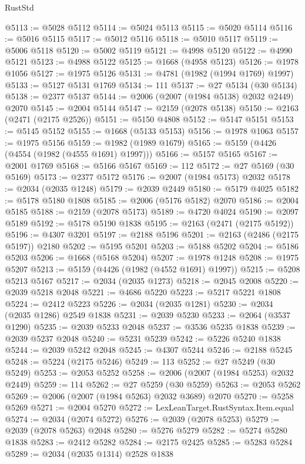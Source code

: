 \begin{lexlean}{RustStd}
\begin{coremodule}
@5113 := @5028 @5112
@5114 := @5024 @5113
@5115 := @5020 @5114
@5116 := @5016 @5115
@5117 := @5012 @5116
@5118 := @5010 @5117
@5119 := @5006 @5118
@5120 := @5002 @5119
@5121 := @4998 @5120
@5122 := @4990 @5121
@5123 := @4988 @5122
@5125 := @1668 (@4958 @5123)
@5126 := @1978 @1056
@5127 := @1975 @5126
@5131 := @4781 (@1982 (@1994 @1769) @1997)
@5133 := @5127 @5131 @1769
@5134 := 111
@5137 := @27 @5134 (@30 @5134)
@5138 := @2377 @5137
@5144 := @2006 (@2007 (@1984 @5138) @2032 @2449) @2070
@5145 := @2004 @5144
@5147 := @2159 (@2078 @5138)
@5150 := @2163 (@2471 (@2175 @2526))
@5151 := @5150 @4808
@5152 := @5147 @5151
@5153 := @5145 @5152
@5155 := @1668 (@5133 @5153)
@5156 := @1978 @1063
@5157 := @1975 @5156
@5159 := @1982 (@1989 @1679)
@5165 := @5159 (@4426 (@4554 (@1982 (@4555 @1691) @1997)))
@5166 := @5157 @5165
@5167 := @2001 @1769
@5168 := @5166 @5167
@5169 := 112
@5172 := @27 @5169 (@30 @5169)
@5173 := @2377 @5172
@5176 := @2007 (@1984 @5173) @2032
@5178 := @2034 (@2035 @1248)
@5179 := @2039 @2449
@5180 := @5179 @4025
@5182 := @5178 @5180 @1808
@5185 := @2006 (@5176 @5182) @2070
@5186 := @2004 @5185
@5188 := @2159 (@2078 @5173)
@5189 := @4720 @4024
@5190 := @2097 @5189
@5192 := @5178 @5190 @1838
@5195 := @2163 (@2471 (@2175 @5192))
@5196 := @4307 @3201
@5197 := @2188 @5196
@5201 := @2163 (@2486 (@2175 @5197)) @2180
@5202 := @5195 @5201
@5203 := @5188 @5202
@5204 := @5186 @5203
@5206 := @1668 (@5168 @5204)
@5207 := @1978 @1248
@5208 := @1975 @5207
@5213 := @5159 (@4426 (@1982 (@4552 @1691) @1997))
@5215 := @5208 @5213 @5167
@5217 := @2034 (@2035 @1273)
@5218 := @2045 @2008
@5220 := @2039 @5218 @2048
@5221 := @4686 @5220
@5223 := @5217 @5221 @1808
@5224 := @2412 @5223
@5226 := @2034 (@2035 @1281)
@5230 := @2034 (@2035 @1286) @2549 @1838
@5231 := @2039 @5230
@5233 := @2064 (@3537 @1290)
@5235 := @2039 @5233 @2048
@5237 := @3536 @5235 @1838
@5239 := @2039 @5237 @2048
@5240 := @5231 @5239
@5242 := @5226 @5240 @1838
@5244 := @2039 @5242 @2048
@5245 := @4307 @5244
@5246 := @2188 @5245
@5248 := @5224 (@2175 @5246)
@5249 := 113
@5252 := @27 @5249 (@30 @5249)
@5253 := @2053 @5252
@5258 := @2006 (@2007 (@1984 @5253) @2032 @2449)
@5259 := 114
@5262 := @27 @5259 (@30 @5259)
@5263 := @2053 @5262
@5269 := @2006 (@2007 (@1984 @5263) @2032 @3689) @2070
@5270 := @5258 @5269
@5271 := @2004 @5270
@5272 := LexLeanTarget.RustSyntax.Item.equal
@5274 := @2034 (@2074 @5272)
@5276 := @2039 (@2078 @5253)
@5279 := @2039 (@2078 @5263) @2048
@5280 := @5276 @5279
@5282 := @5274 @5280 @1838
@5283 := @2412 @5282
@5284 := @2175 @2425
@5285 := @5283 @5284
@5289 := @2034 (@2035 @1314) @2528 @1838

\end{coremodule}
\end{lexlean}
